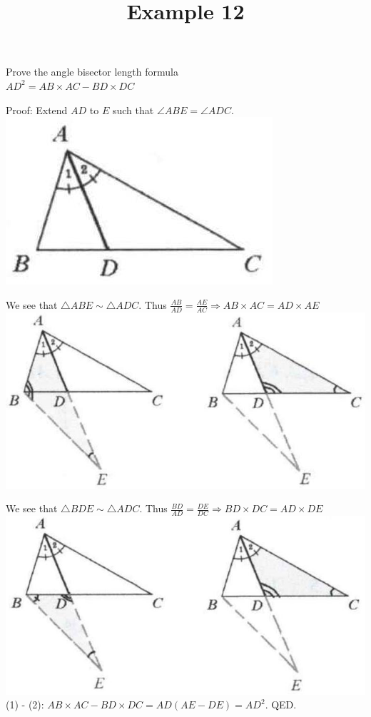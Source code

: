 \documentclass{article}
\title{Example 12}
\date{}
\begin{document}
\maketitle

Prove the angle bisector length formula\\
\(A D^{2}=A B \times A C-B D \times D C\)

Proof:
Extend \(A D\) to \(E\) such that \(\angle A B E=\angle A D C\).\\
\centering
\includegraphics[width=\textwidth]{images/062.jpg}

We see that \(\triangle A B E \sim \triangle A D C\). Thus \(\frac{A B}{A D}=\frac{A E}{A C} \Rightarrow A B \times A C=A D \times A E\)\\
\centering
\includegraphics[width=\textwidth]{images/063(1).jpg}

We see that \(\triangle B D E \sim \triangle A D C\). Thus \(\frac{B D}{A D}=\frac{D E}{D C} \Rightarrow B D \times D C=A D \times D E\)\\
\centering
\includegraphics[width=\textwidth]{images/063.jpg}\\
(1) - (2): \(A B \times A C-B D \times D C=A D(A E-D E)=A D^{2}\). QED.
\end{document}
